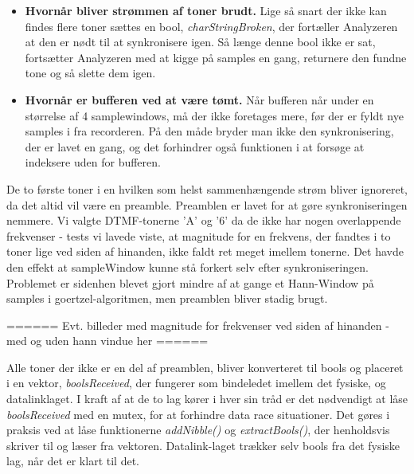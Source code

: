 \begin{itemize}

\item \textbf{Hvornår bliver strømmen af toner brudt.} Lige så snart der ikke kan findes flere toner sættes en bool, \textit{charStringBroken}, der fortæller Analyzeren at den er nødt til at synkronisere igen. Så længe denne bool ikke er sat, fortsætter Analyzeren med at kigge på samples en gang, returnere den fundne tone og så slette dem igen. 
\item \textbf{Hvornår er bufferen ved at være tømt.} Når bufferen når under en størrelse af 4 samplewindows, må der ikke foretages mere, før der er fyldt nye samples i fra recorderen. På den måde bryder man ikke den synkronisering, der er lavet en gang, og det forhindrer også funktionen i at forsøge at indeksere uden for bufferen.
\end{itemize}

De to første toner i en hvilken som helst sammenhængende strøm bliver ignoreret, da det altid vil være en preamble. Preamblen er lavet for at gøre synkroniseringen nemmere. Vi valgte DTMF-tonerne 'A' og '6' da de ikke har nogen overlappende frekvenser - tests vi lavede viste, at magnitude for en frekvens, der fandtes i to toner lige ved siden af hinanden, ikke faldt ret meget imellem tonerne. Det havde den effekt at sampleWindow kunne stå forkert selv efter synkroniseringen. Problemet er sidenhen blevet gjort mindre af at gange et Hann-Window på samples i goertzel-algoritmen, men preamblen bliver stadig brugt. 

====== Evt. billeder med magnitude for frekvenser ved siden af hinanden - med og uden hann vindue her ======

Alle toner der ikke er en del af preamblen, bliver konverteret til bools og placeret i en vektor, \textit{boolsReceived}, der fungerer som bindeledet imellem det fysiske, og datalinklaget. I kraft af at de to lag kører i hver sin tråd er det nødvendigt at låse \textit{boolsReceived} med en mutex, for at forhindre data race situationer. Det gøres i praksis ved at låse funktionerne \textit{addNibble()} og \textit{extractBools()}, der henholdsvis skriver til og læser fra vektoren. Datalink-laget trækker selv bools fra det fysiske lag, når det er klart til det.
